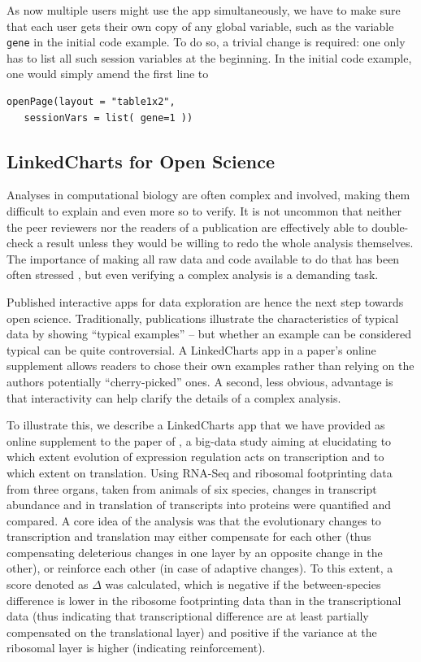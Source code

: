 \documentclass[twocolumn,10pt]{article}
\begin{document}
As now multiple users might use the app simultaneously, we have to make sure that each user gets their own copy of any global variable, such as the variable \texttt{gene} in the initial code example. To do so, a trivial change is required: one only has to list all such session variables at the beginning. In the initial code example, one would simply amend the first line to 
\begin{verbatim}
openPage(layout = "table1x2", 
   sessionVars = list( gene=1 ))
\end{verbatim}


\subsection{LinkedCharts for Open Science}

Analyses in computational biology are often complex and involved, making them difficult to explain and even more so to verify. It is not uncommon that neither the peer reviewers nor the readers of a publication are effectively able to double-check a result unless they would be willing to redo the whole analysis themselves. The importance of making all raw data and code available to do that has been often stressed \citep{gentleman_2005}, but even verifying a complex analysis is a demanding task.

Published interactive apps for data exploration are hence the next step towards open science. Traditionally, publications illustrate the characteristics of typical data by showing ``typical examples'' -- but whether an example can be considered typical can be quite controversial. A LinkedCharts app in a paper's online supplement allows readers to chose their own examples rather than relying on the authors potentially ``cherry-picked'' ones. A second, less obvious, advantage is that interactivity can help clarify the details of a complex analysis.

To illustrate this, we describe a LinkedCharts app that we have provided as online supplement to the paper of \citet{wang_2020}, a big-data study aiming at elucidating to which extent evolution of expression regulation acts on transcription and to which extent on translation. Using RNA-Seq and ribosomal footprinting data from three organs, taken from animals of six species, changes in transcript abundance and in translation of transcripts into proteins were quantified and compared. A core idea of the analysis was that the evolutionary changes to transcription and translation may either compensate for each other  (thus compensating deleterious changes in one layer by an opposite change in the other), or reinforce each other (in case of adaptive changes). To this extent, a score denoted as $\Delta$ was calculated, which is negative if the between-species difference is lower in the ribosome footprinting data than in the transcriptional data (thus indicating that transcriptional difference are at least partially compensated on the translational layer) and positive if the variance at the ribosomal layer is higher (indicating reinforcement).
\end{document}

